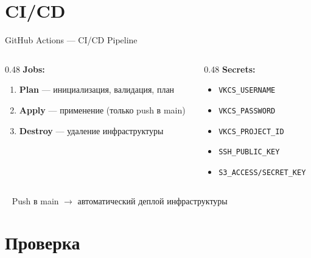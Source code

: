 \documentclass[10pt,aspectratio=169]{beamer}
\begin{document}
\section{CI/CD}

\begin{frame}{GitHub Actions --- CI/CD Pipeline}

  \begin{columns}[T]
    \begin{column}{0.48\textwidth}
      \textbf{Jobs:}
      \begin{enumerate}
        \item \textbf{Plan} --- инициализация, валидация, план
        \item \textbf{Apply} --- применение (только push в main)
        \item \textbf{Destroy} --- удаление инфраструктуры
      \end{enumerate}
    \end{column}
    \begin{column}{0.48\textwidth}
      \textbf{Secrets:}
      \begin{itemize}
        \item \texttt{VKCS\_USERNAME}
        \item \texttt{VKCS\_PASSWORD}
        \item \texttt{VKCS\_PROJECT\_ID}
        \item \texttt{SSH\_PUBLIC\_KEY}
        \item \texttt{S3\_ACCESS/SECRET\_KEY}
      \end{itemize}
    \end{column}
  \end{columns}

  \vspace{0.3cm}
  \begin{exampleblock}{}
    \centering
    \faGithub ~ Push в main $\rightarrow$ автоматический деплой инфраструктуры
  \end{exampleblock}
\end{frame}

\section{Проверка}
\end{document}

